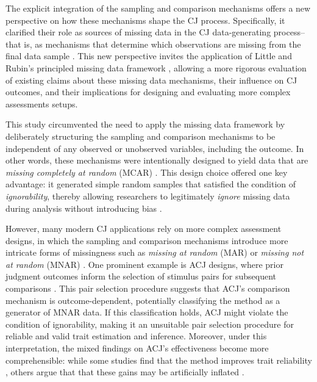 \documentclass[
  authoryear,
  review,
  1p]{elsarticle}
\begin{document}
The explicit integration of the sampling and comparison mechanisms
offers a new perspective on how these mechanisms shape the CJ process.
Specifically, it clarified their role as sources of missing data in the
CJ data-generating process--that is, as mechanisms that determine which
observations are missing from the final data sample
\citetext{\citealp{Kohler_et_al_2019}; \citealp[chap.~15]{McElreath_2020}; \citealp{Schuessler_et_al_2023}}.
This new perspective invites the application of Little and Rubin's
principled missing data framework \citep{Little_et_al_2020}, allowing a
more rigorous evaluation of existing claims about these missing data
mechanisms, their influence on CJ outcomes, and their implications for
designing and evaluating more complex assessments setups.

This study circumvented the need to apply the missing data framework by
deliberately structuring the sampling and comparison mechanisms to be
independent of any observed or unobserved variables, including the
outcome. In other words, these mechanisms were intentionally designed to
yield data that are \emph{missing completely at random} (MCAR)
\citep{Little_et_al_2020}. This design choice offered one key advantage:
it generated simple random samples that satisfied the condition of
\emph{ignorability}, thereby allowing researchers to legitimately
\emph{ignore} missing data during analysis without introducing bias
\citep{Everitt_et_al_2010, Kohler_et_al_2019, Neal_2020}.

However, many modern CJ applications rely on more complex assessment
designs, in which the sampling and comparison mechanisms introduce more
intricate forms of missingness such as \emph{missing at random} (MAR) or
\emph{missing not at random} (MNAR) \citep{Little_et_al_2020}. One
prominent example is ACJ designs, where prior judgment outcomes inform
the selection of stimulus pairs for subsequent comparisons
\citep{Pollitt_2012a, Pollitt_2012b, Bramley_2015}. This pair selection
procedure suggests that ACJ's comparison mechanism is outcome-dependent,
potentially classifying the method as a generator of MNAR data. If this
classification holds, ACJ might violate the condition of ignorability,
making it an unsuitable pair selection procedure for reliable and valid
trait estimation and inference. Moreover, under this interpretation, the
mixed findings on ACJ's effectiveness become more comprehensible: while
some studies find that the method improves trait reliability
\citep{Pollitt_et_al_2003, Pollitt_2012a, Pollitt_2012b}, others argue
that that these gains may be artificially inflated
\citep{Bramley_2015, Bramley_et_al_2019, Crompvoets_et_al_2020, Crompvoets_et_al_2022}.
\end{document}
